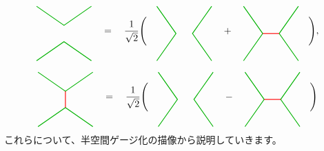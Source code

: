 \documentclass[report,paper=a4, fontsize=12pt, line_length=16cm, number_of_lines=33,dvipdfmx]{jlreq}
\numberwithin{equation}{chapter}
\begin{document}
\begin{align}
  \begin{tikzpicture}[baseline=0]
      \coordinate(A) at (-1,-1);
      \coordinate(B) at (1,-1);
      \coordinate(C) at (1,1);
      \coordinate(D) at (-1,1);
      \draw[darkgreen,thick] (D)--(0,0.3)--(C);
      \draw[darkgreen,thick] (A)--(0,-0.3)--(B);
  \end{tikzpicture}
  \quad=\quad \frac{1}{\sqrt{2}}\Bigg(
  \quad
  \begin{tikzpicture}[baseline=0]
      \coordinate(A) at (-1,-1);
      \coordinate(B) at (1,-1);
      \coordinate(C) at (1,1);
      \coordinate(D) at (-1,1);
      \draw[darkgreen,thick] (D)--(-0.3,0)--(A);
      \draw[darkgreen,thick] (C)--(0.3,0)--(B);
  \end{tikzpicture}
  \quad
  +
  \quad
  \begin{tikzpicture}[baseline=0]
      \coordinate(A) at (-1,-1);
      \coordinate(B) at (1,-1);
      \coordinate(C) at (1,1);
      \coordinate(D) at (-1,1);
      \draw[darkgreen,thick] (D)--(-0.3,0)--(A);
      \draw[darkgreen,thick] (C)--(0.3,0)--(B);
      \draw[red,thick] (0.3,0)--(-0.3,0);
  \end{tikzpicture}
  \quad
  \Bigg),
\end{align}

\begin{align}
  \begin{tikzpicture}[baseline=0]
      \coordinate(A) at (-1,-1);
      \coordinate(B) at (1,-1);
      \coordinate(C) at (1,1);
      \coordinate(D) at (-1,1);
      \draw[darkgreen,thick] (D)--(0,0.3)--(C);
      \draw[darkgreen,thick] (A)--(0,-0.3)--(B);
      \draw[red,thick] (0,0.3)--(0,-0.3);
  \end{tikzpicture}
  \quad=\quad \frac{1}{\sqrt{2}}\Bigg(
  \quad
  \begin{tikzpicture}[baseline=0]
      \coordinate(A) at (-1,-1);
      \coordinate(B) at (1,-1);
      \coordinate(C) at (1,1);
      \coordinate(D) at (-1,1);
      \draw[darkgreen,thick] (D)--(-0.3,0)--(A);
      \draw[darkgreen,thick] (C)--(0.3,0)--(B);
  \end{tikzpicture}
  \quad
  -
  \quad
  \begin{tikzpicture}[baseline=0]
      \coordinate(A) at (-1,-1);
      \coordinate(B) at (1,-1);
      \coordinate(C) at (1,1);
      \coordinate(D) at (-1,1);
      \draw[darkgreen,thick] (D)--(-0.3,0)--(A);
      \draw[darkgreen,thick] (C)--(0.3,0)--(B);
      \draw[red,thick] (0.3,0)--(-0.3,0);
  \end{tikzpicture}
  \quad
  \Bigg)
\end{align}
これらについて、半空間ゲージ化の描像から説明していきます。
\end{document}
